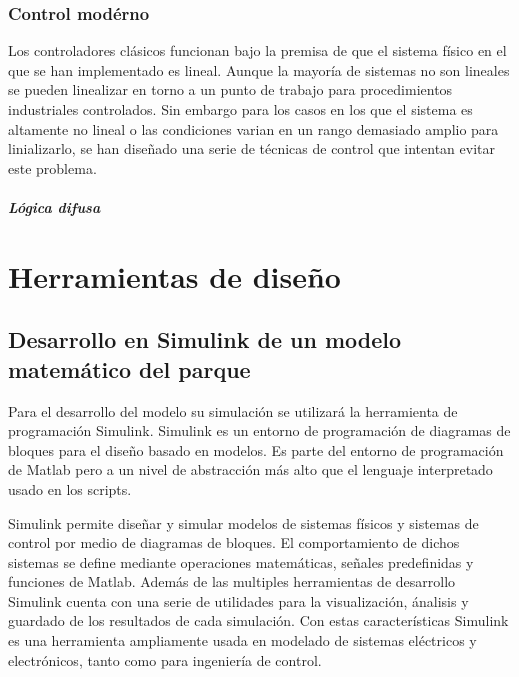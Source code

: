 \documentclass{book}
\begin{document}
	\subsection{Control mod\'erno}

Los controladores cl\'asicos funcionan bajo la premisa de que el sistema f\'isico en el que se han implementado es lineal. Aunque la mayor\'ia de sistemas no son lineales se pueden linealizar en torno a un punto de trabajo para procedimientos industriales controlados. Sin embargo para los casos en los que el sistema es altamente no lineal o las condiciones varian en un rango demasiado amplio para linializarlo, se han diseñado una serie de t\'ecnicas de control que intentan evitar este problema.  \par

		\paragraph{L\'ogica difusa}




\chapter{Herramientas de diseño}


	\section{Desarrollo en Simulink de un modelo matem\'atico del parque}

Para el desarrollo del modelo su simulaci\'on se utilizar\'a la herramienta de programaci\'on Simulink. Simulink es un entorno de programaci\'on de diagramas de bloques para el diseño basado en modelos. Es parte del entorno de programaci\'on de Matlab pero a un nivel de abstracci\'on m\'as alto que el lenguaje interpretado usado en los scripts. \par

Simulink permite diseñar y simular modelos de sistemas f\'isicos y sistemas de control por medio de diagramas de bloques. El comportamiento de dichos sistemas se define mediante operaciones matem\'aticas, señales predefinidas y funciones de Matlab. Adem\'as de las multiples herramientas de desarrollo Simulink cuenta con una serie de utilidades para la visualizaci\'on, \'analisis y guardado de los resultados de cada simulaci\'on. Con estas caracter\'isticas Simulink es una herramienta ampliamente usada en modelado de sistemas el\'ectricos y electr\'onicos, tanto como para ingenier\'ia de control. \par
\end{document}
